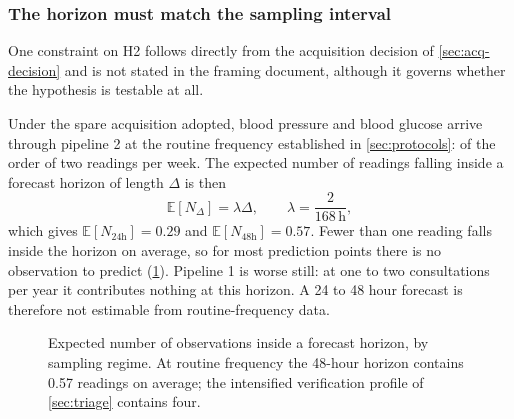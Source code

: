 \documentclass[12pt,a4paper,oneside]{report}
\begin{document}
\subsubsection{The horizon must match the sampling interval}\label{sec:horizon}

One constraint on H2 follows directly from the acquisition decision of \cref{sec:acq-decision} and is not stated in the framing document, although it governs whether the hypothesis is testable at all.

Under the spare acquisition adopted, blood pressure and blood glucose arrive through pipeline 2 at the routine frequency established in \cref{sec:protocols}: of the order of two readings per week. The expected number of readings falling inside a forecast horizon of length $\Delta$ is then
\begin{equation}
  \mathbb{E}[N_\Delta] = \lambda\Delta, \qquad \lambda = \frac{2}{168\,\text{h}},
\end{equation}
which gives $\mathbb{E}[N_{24\text{h}}] = 0.29$ and $\mathbb{E}[N_{48\text{h}}] = 0.57$. Fewer than one reading falls inside the horizon on average, so for most prediction points there is no observation to predict (\cref{fig:sampling-horizon}). Pipeline 1 is worse still: at one to two consultations per year it contributes nothing at this horizon. A 24 to 48 hour forecast is therefore not estimable from routine-frequency data.

\begin{figure}[htbp]
\centering
{}
\caption{Expected number of observations inside a forecast horizon, by sampling regime. At routine frequency the 48-hour horizon contains 0.57 readings on average; the intensified verification profile of \cref{sec:triage} contains four.}\label{fig:sampling-horizon}
\end{figure}
\end{document}
